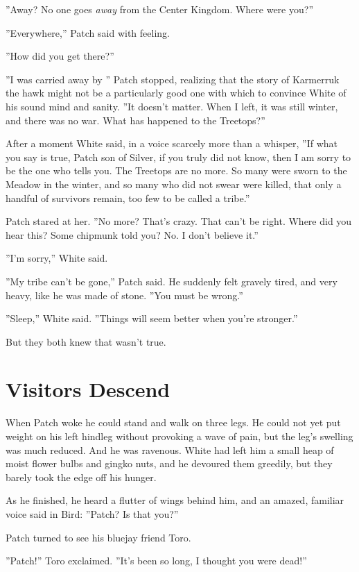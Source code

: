 \documentclass[12pt]{book}
\begin{document}
''Away? No one goes {\it away} from the Center Kingdom. Where were you?''

''Everywhere,'' Patch said with feeling.

''How did you get there?''

''I was carried away by %
'' Patch stopped, realizing that the story of Karmerruk the hawk might not be a particularly good one with which to convince White of his sound mind and sanity. ''It doesn't matter. When I left, it was still winter, and there was no war. What has happened to the Treetops?''

After a moment White said, in a voice scarcely more than a whisper, ''If what you say is true, Patch son of Silver, if you truly did not know, then I am sorry to be the one who tells you. The Treetops are no more. So many were sworn to the Meadow in the winter, and so many who did not swear were killed, that only a handful of survivors remain, too few to be called a tribe.''

Patch stared at her. ''No more? That's crazy. That can't be right. Where did you hear this? Some chipmunk told you? No. I don't believe it.''

''I'm sorry,'' White said.

''My tribe can't be gone,'' Patch said. He suddenly felt gravely tired, and very heavy, like he was made of stone. ''You must be wrong.''

''Sleep,'' White said. ''Things will seem better when you're stronger.''

But they both knew that wasn't true.


\section{Visitors Descend}

When Patch woke he could stand and walk on three legs. He could not yet put weight on his left hindleg without provoking a wave of pain, but the leg's swelling was much reduced. And he was ravenous. White had left him a small heap of moist flower bulbs and gingko nuts, and he devoured them greedily, but they barely took the edge off his hunger.

As he finished, he heard a flutter of wings behind him, and an amazed, familiar voice said in Bird: ''Patch? Is that you?''

Patch turned to see his bluejay friend Toro.

''Patch!'' Toro exclaimed. ''It's been so long, I thought you were dead!''
\end{document}
